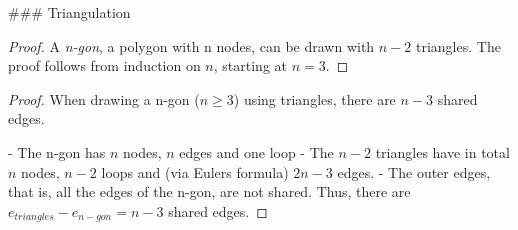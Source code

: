 ### Triangulation

\begin{proof} A \emph{n-gon}, a polygon with n nodes, can be drawn with $n-2$ triangles.
The proof follows from induction on $n$, starting at $n=3$.
\end{proof}

\begin{proof} When drawing a n-gon ($n \geq 3$) using triangles, there are $n-3$ shared edges.

    - The n-gon has $n$ nodes, $n$ edges and one loop
    - The $n-2$ triangles have in total $n$ nodes, $n-2$ loops and (via Eulers formula) $2n-3$ edges.
    - The outer edges, that is, all the edges of the n-gon, are not shared. Thus, there are $e_{triangles} - e_{n-gon} = n-3$ shared edges.

\end{proof}



